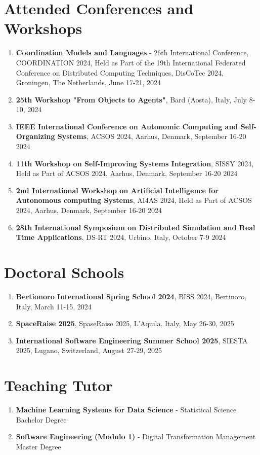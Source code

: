 \documentclass[runningheads]{llncs}
\begin{document}
\section{Attended Conferences and Workshops}
\begin{enumerate}
    \item \textbf{Coordination Models and Languages} - 26th International Conference, COORDINATION 2024, Held as Part of the 19th International Federated Conference on Distributed Computing Techniques, DisCoTec 2024, Groningen, The Netherlands, June 17-21, 2024
    \item \textbf{25th Workshop "From Objects to Agents"}, Bard (Aosta), Italy, July 8-10, 2024
    \item \textbf{IEEE International Conference on Autonomic Computing and Self-Organizing Systems}, ACSOS 2024, Aarhus, Denmark, September 16-20 2024
    \item \textbf{11th Workshop on Self-Improving Systems Integration}, SISSY 2024, Held as Part of ACSOS 2024, Aarhus, Denmark, September 16-20 2024
    \item \textbf{2nd International Workshop on Artificial Intelligence for Autonomous computing Systems}, AI4AS 2024, Held as Part of ACSOS 2024, Aarhus, Denmark, September 16-20 2024
    \item \textbf{28th International Symposium on Distributed Simulation and Real Time Applications}, DS-RT 2024, Urbino, Italy, October 7-9 2024
\end{enumerate}

\section{Doctoral Schools}
\begin{enumerate}
    \item \textbf{Bertionoro International Spring School 2024}, BISS 2024, Bertinoro, Italy, March 11-15, 2024
    \item \textbf{SpaceRaise 2025}, SpaseRaise 2025, L'Aquila, Italy, May 26-30, 2025
    \item \textbf{International Software Engineering Summer School 2025}, SIESTA 2025, Lugano, Switzerland, August 27-29, 2025
\end{enumerate}

\section{Teaching Tutor}
\begin{enumerate}
    \item \textbf{Machine Learning Systems for Data Science} - Statistical Science Bachelor Degree
    \item \textbf{Software Engineering (Modulo 1)} - Digital Transformation Management Master Degree
\end{enumerate}
\end{document}
